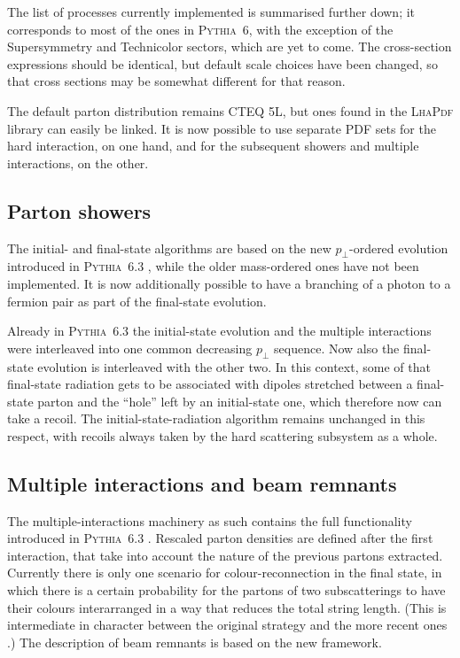 \documentclass{elsartmod}
\begin{document}
The list of processes currently implemented is summarised further 
down; it corresponds to most of the ones in \textsc{Pythia}~6,
with the exception of the Supersymmetry and Technicolor sectors, 
which are yet to come. The cross-section expressions should be 
identical, but default scale choices have been changed, so that 
cross sections may be somewhat different for that reason.  

The default parton distribution remains CTEQ 5L, but ones found in the
\textsc{LhaPdf} library \cite{lhapdf} can easily be linked.  It is now
possible to use separate PDF sets for the hard interaction, on one
hand, and for the subsequent showers and multiple interactions, on the
other.

\subsection{Parton showers}

The initial- and final-state algorithms are based on the 
new $p_{\perp}$-ordered evolution introduced in \textsc{Pythia}~6.3
\cite{ptshowers}, while the older mass-ordered ones have not been 
implemented. It is now additionally possible to have a branching 
of a photon to a fermion pair as part of the final-state evolution.

Already in \textsc{Pythia}~6.3 the initial-state evolution and
the multiple interactions were interleaved into one common 
decreasing $p_{\perp}$ sequence. Now also the final-state evolution 
is interleaved with the other two. In this context, some of that 
final-state radiation gets to be associated with dipoles stretched 
between a final-state parton and the ``hole'' left by an 
initial-state one, which therefore now can take a recoil.
The initial-state-radiation algorithm remains unchanged in this
respect, with recoils always taken by the hard scattering subsystem 
as a whole. 

\subsection{Multiple interactions and beam remnants}

The multiple-interactions machinery as such contains the full
functionality introduced in \textsc{Pythia}~6.3 \cite{newremnants}. 
Rescaled parton densities are defined after the first interaction, 
that take into account the nature of the previous partons extracted. 
Currently there is only one scenario for colour-reconnection in the 
final state, in which there is a certain probability for the partons of
two subscatterings to have their colours interarranged in a way that
reduces the total string length. (This is intermediate in character 
between the original strategy \cite{zijl} and the more recent ones
\cite{wicke}.) The description of beam remnants is based on the 
new framework. 
\end{document}
